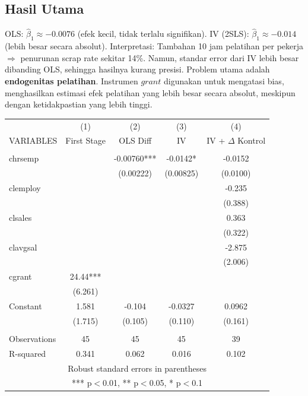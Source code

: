 \documentclass[]{article}
\begin{document}
\subsection*{Hasil Utama}
OLS: $\hat{\beta}_1 \approx -0.0076$ (efek kecil, tidak terlalu signifikan). IV (2SLS): $\hat{\beta}_1 \approx -0.014$ (lebih besar secara absolut). Interpretasi: Tambahan 10 jam pelatihan per pekerja $\Rightarrow$ penurunan scrap rate sekitar 14\%.  Namun, standar error dari IV lebih besar dibanding OLS, sehingga hasilnya kurang presisi.  Problem utama adalah \textbf{endogenitas pelatihan}. 
Instrumen $grant$ digunakan untuk mengatasi bias, menghasilkan estimasi efek pelatihan yang lebih besar secara absolut, 
meskipun dengan ketidakpastian yang lebih tinggi.

\begin{table}[htb]
    \centering
\begin{tabular}{lcccc} \hline
 & (1) & (2) & (3) & (4) \\
VARIABLES & First Stage & OLS Diff & IV & IV + $\Delta$ Kontrol \\ \hline
 &  &  &  &  \\
chrsemp &  & -0.00760*** & -0.0142* & -0.0152 \\
 &  & (0.00222) & (0.00825) & (0.0100) \\
clemploy &  &  &  & -0.235 \\
 &  &  &  & (0.388) \\
clsales &  &  &  & 0.363 \\
 &  &  &  & (0.322) \\
clavgsal &  &  &  & -2.875 \\
 &  &  &  & (2.006) \\
cgrant & 24.44*** &  &  &  \\
 & (6.261) &  &  &  \\
Constant & 1.581 & -0.104 & -0.0327 & 0.0962 \\
 & (1.715) & (0.105) & (0.110) & (0.161) \\
 &  &  &  &  \\
Observations & 45 & 45 & 45 & 39 \\
 R-squared & 0.341 & 0.062 & 0.016 & 0.102 \\ \hline
\multicolumn{5}{c}{ Robust standard errors in parentheses} \\
\multicolumn{5}{c}{ *** p$<$0.01, ** p$<$0.05, * p$<$0.1} \\
\end{tabular}
    \label{tab:placeholder}
\end{table}
\newpage
\end{document}
